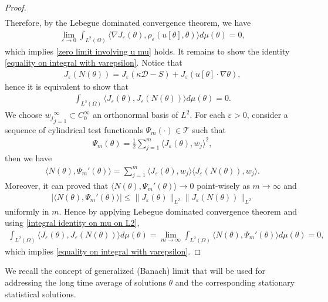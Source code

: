 \documentclass[reqno]{amsart}%
\theoremstyle{definition}
\theoremstyle{remark}
\numberwithin{equation}{section}
\newcommand{\1}{\mathbf{1}}
\numberwithin{equation}{section}
\numberwithin{theorem}{section}
\numberwithin{figure}{section}
\begin{document}
\begin{proof}
\begin{align*}
\end{align*}
Therefore, by the Lebegue dominated convergence theorem, we have
\begin{align*}
\lim_{\varepsilon\to0}\int_{L^2(\Omega)}\langle \nabla J_{\varepsilon}(\theta),\rho_{\varepsilon}(u[\theta],\theta)\rangle d\mu(\theta)=0,
\end{align*}
which implies \eqref{zero limit involving u mu} holds. It remains to show the identity \eqref{equality on integral with varepsilon}. Notice that
\begin{align*}
J_{\varepsilon}(N(\theta))=J_{\varepsilon}(\kappa\mathcal{D}-S)+J_{\varepsilon}(u[\theta]\cdot\nabla\theta),
\end{align*}
hence it is equivalent to show that
\begin{align*}
\int_{L^2(\Omega)}\langle J_{\varepsilon}(\theta),J_{\varepsilon}(N(\theta))\rangle d\mu(\theta)=0.
\end{align*}
We choose ${w_j}_{j=1}^{\infty}\subset C^{\infty}_0$ an orthonormal basis of $L^2$. For each $\varepsilon>0$, consider a sequence of cylindrical test functionals $\Psi_m(\cdot)\in \mathcal{T}$ such that
\begin{align*}
\Psi_m(\theta)=\frac{1}{2}\sum_{j=1}^m\langle J_{\varepsilon}(\theta),w_j\rangle^2,
\end{align*}
then we have
\begin{align*}
\langle N(\theta),\Psi_m'(\theta)\rangle = \sum_{j=1}^m\langle J_{\varepsilon}(\theta),w_j\rangle\langle J_{\varepsilon}(N(\theta)),w_j\rangle.
\end{align*}
Moreover, it can proved that $\langle N(\theta),\Psi_m'(\theta)\rangle\to0$ point-wisely as $m\to\infty$ and
\begin{align*}
|\langle N(\theta),\Psi_m'(\theta)\rangle|\le \|J_{\varepsilon}(\theta)\|_{L^2}\|J_{\varepsilon}(N(\theta))\|_{L^2}
\end{align*}
uniformly in $m$. Hence by applying Lebegue dominated convergence theorem and using \eqref{integral identity on mu on L2},
\begin{align*}
\int_{L^2(\Omega)}\langle J_{\varepsilon}(\theta),J_{\varepsilon}(N(\theta))\rangle d\mu(\theta)=\lim_{m\to\infty}\int_{L^2(\Omega)}\langle N(\theta),\Psi_m'(\theta)\rangle d\mu(\theta)=0,
\end{align*}
which implies \eqref{equality on integral with varepsilon}.
\end{proof}

We recall the concept of generalized (Banach) limit that will be used for addressing the long time average of solutions $\theta$ and the corresponding stationary statistical solutions.
\end{document}
